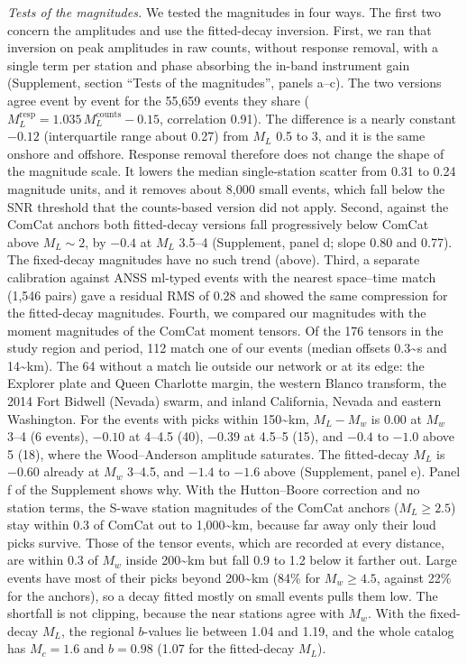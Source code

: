 \documentclass[review]{seismica}
\begin{document}
\emph{Tests of the magnitudes.} We tested the magnitudes in four ways.
The first two concern the amplitudes and use the fitted-decay inversion.
First, we ran that inversion on peak amplitudes in raw counts, without
response removal, with a single term per station and phase absorbing the
in-band instrument gain (Supplement, section ``Tests of the
magnitudes'', panels a--c). The two versions agree event by event for
the 55,659 events they share
(\(M_L^{\mathrm{resp}} = 1.035\,M_L^{\mathrm{counts}} - 0.15\),
correlation 0.91). The difference is a nearly constant \(-0.12\)
(interquartile range about 0.27) from \(M_L\) 0.5 to 3, and it is the
same onshore and offshore. Response removal therefore does not change
the shape of the magnitude scale. It lowers the median single-station
scatter from 0.31 to 0.24 magnitude units, and it removes about 8,000
small events, which fall below the SNR threshold that the counts-based
version did not apply. Second, against the ComCat anchors both
fitted-decay versions fall progressively below ComCat above
\(M_L\sim2\), by \(-0.4\) at \(M_L\) 3.5--4 (Supplement, panel d; slope
0.80 and 0.77). The fixed-decay magnitudes have no such trend (above).
Third, a separate calibration against ANSS ml-typed events with the
nearest space--time match (1,546 pairs) gave a residual RMS of 0.28 and
showed the same compression for the fitted-decay magnitudes. Fourth, we
compared our magnitudes with the moment magnitudes of the ComCat moment
tensors. Of the 176 tensors in the study region and period, 112 match
one of our events (median offsets 0.3\textasciitilde s and
14\textasciitilde km). The 64 without a match lie outside our network or
at its edge: the Explorer plate and Queen Charlotte margin, the western
Blanco transform, the 2014 Fort Bidwell (Nevada) swarm, and inland
California, Nevada and eastern Washington. For the events with picks
within 150\textasciitilde km, \(M_L-M_w\) is \(0.00\) at \(M_w\) 3--4 (6
events), \(-0.10\) at 4--4.5 (40), \(-0.39\) at 4.5--5 (15), and
\(-0.4\) to \(-1.0\) above 5 (18), where the Wood--Anderson amplitude
saturates. The fitted-decay \(M_L\) is \(-0.60\) already at \(M_w\)
3--4.5, and \(-1.4\) to \(-1.6\) above (Supplement, panel e). Panel f of
the Supplement shows why. With the Hutton--Boore correction and no
station terms, the S-wave station magnitudes of the ComCat anchors
(\(M_L\ge2.5\)) stay within 0.3 of ComCat out to
1,000\textasciitilde km, because far away only their loud picks survive.
Those of the tensor events, which are recorded at every distance, are
within 0.3 of \(M_w\) inside 200\textasciitilde km but fall 0.9 to 1.2
below it farther out. Large events have most of their picks beyond
200\textasciitilde km (84\% for \(M_w\ge4.5\), against 22\% for the
anchors), so a decay fitted mostly on small events pulls them low. The
shortfall is not clipping, because the near stations agree with \(M_w\).
With the fixed-decay \(M_L\), the regional \(b\)-values lie between 1.04
and 1.19, and the whole catalog has \(M_c=1.6\) and \(b=0.98\) (1.07 for
the fitted-decay \(M_L\)).
\end{document}
